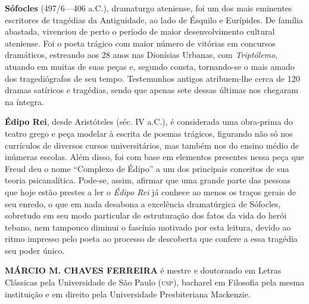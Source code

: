 \textbf{Sófocles} (497/6---406 a.C.), dramaturgo ateniense, foi um dos mais eminentes 
escritores de tragédias da Antiguidade, ao lado de Ésquilo e Eurípides. De família abastada, vivenciou de perto 
o período de maior desenvolvimento cultural ateniense. Foi o poeta trágico com maior 
número de vitórias em concursos dramáticos, estreando aos 28 anos nas Dionísias Urbanas, com \textit{Triptólemo}, 
atuando em muitas de suas peças e, segundo consta, tornando-se o mais amado dos tragediógrafos de seu tempo. 
Testemunhos antigos atribuem-lhe cerca de 120 dramas satíricos e tragédias, sendo que apenas sete dessas últimas nos chegaram na íntegra. 


\textbf{Édipo Rei}, desde Aristóteles (séc. IV a.C.), é considerada uma
obra-prima do teatro grego e peça modelar à escrita de poemas trágicos, 
figurando não só nos currículos de diversos
cursos universitários, mas também nos do ensino médio de inúmeras
escolas. Além disso, foi com base em elementos presentes nessa
peça que Freud deu o nome ``Complexo de Édipo'' a um dos principais
conceitos de sua teoria psicanalítica. Pode-se, assim, afirmar que uma grande 
parte das pessoas que hoje estão prestes
a ler o \textit{Édipo Rei} já conhece ao menos os traços
gerais de seu enredo, o que em nada desabona a excelência dramatúrgica de Sófocles,
sobretudo em seu modo particular de estruturação dos fatos da vida do herói
tebano, nem tampouco diminui o fascínio motivado por esta leitura, 
devido ao ritmo impresso pelo poeta ao processo de descoberta que
confere a essa tragédia seu poder único.


\textbf{MÁRCIO M. CHAVES FERREIRA} é mestre e doutorando em Letras Clássicas pela Universidade 
de São Paulo (\textsc{usp}), bacharel em Filosofia pela mesma instituição e em direito pela 
Universidade Presbiteriana Mackenzie.